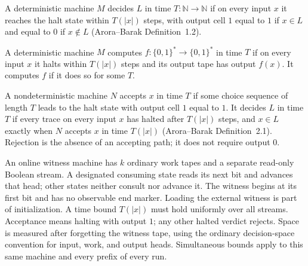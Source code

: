 \begin{definition}
  \label{def:tm-decides}
  \leanok
  A deterministic machine $M$ decides $L$ in time $T : \mathbb{N} \to \mathbb{N}$
  if on every input $x$ it reaches the halt state within $T(|x|)$ steps, with
  output cell $1$ equal to $1$ if $x \in L$ and equal to $0$ if $x \notin L$
  (Arora--Barak Definition~1.2).
\end{definition}

\begin{definition}
  \label{def:tm-computes}
  \leanok
  A deterministic machine $M$ computes $f : \{0,1\}^* \to \{0,1\}^*$ in time $T$
  if on every input $x$ it halts within $T(|x|)$ steps and its output tape has
  output $f(x)$. It computes $f$ if it does so for some $T$.
\end{definition}

\begin{definition}
  \label{def:ntm-decides}
  \leanok
  A nondeterministic machine $N$ accepts $x$ in time $T$ if some choice sequence
  of length $T$ leads to the halt state with output cell $1$ equal to $1$. It
  decides $L$ in time $T$ if every trace on every input $x$ has halted after
  $T(|x|)$ steps, and $x \in L$ exactly when $N$ accepts $x$ in time $T(|x|)$
  (Arora--Barak Definition~2.1). Rejection is the absence of an accepting path;
  it does not require output $0$.
\end{definition}

\begin{definition}
  \label{def:models-witness-tm}
  \leanok
  An online witness machine has $k$ ordinary work tapes and a separate read-only
  Boolean stream. A designated consuming state reads its next bit and advances
  that head; other states neither consult nor advance it. The witness begins
  at its first bit and has no observable end marker. Loading the external
  witness is part of initialization. A time bound $T(|x|)$ must hold uniformly
  over all streams. Acceptance means halting with output $1$; any other halted
  verdict rejects. Space is measured after forgetting the witness tape, using
  the ordinary decision-space convention for input, work, and output heads.
  Simultaneous bounds apply to this same machine and every prefix of every run.
\end{definition}

